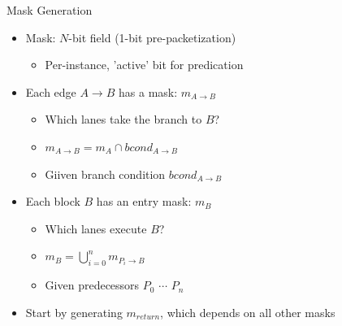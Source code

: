 \begin{frame}{Mask Generation}

\begin{minipage}[t]{0.50\linewidth}

\begin{itemize}
    \item Mask: $N$-bit field (1-bit pre-packetization)
    \begin{itemize}
        \item Per-instance, 'active' bit for predication
    \end{itemize}
    \item Each edge $A \rightarrow B$ has a mask: $m_{A \rightarrow B}$
    \begin{itemize}
        \item Which lanes take the branch to $B$?
        \item $m_{A \rightarrow B} = m_A \cap bcond_{A \rightarrow B}$
        \item Giiven branch condition $bcond_{A \rightarrow B}$
    \end{itemize}
    \item Each block $B$ has an entry mask: $m_B$
    \begin{itemize}
        \item Which lanes execute $B$?
        \item $m_B = \bigcup\limits_{i=0}^n  m_{P_i \rightarrow B}$
        \item Given predecessors $P_0$ $\cdots$ $P_n$
    \end{itemize}
    \item Start by generating $m_{return}$, which depends on all other masks
\end{itemize}

\end{minipage}
\hspace{1em}
\begin{minipage}[t]{0.43\linewidth}

\vspace{0.1ex}

\end{minipage}

\end{frame}


